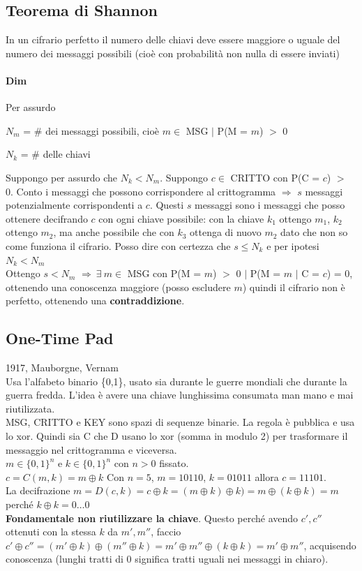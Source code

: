 \documentclass[10pt]{book}
\begin{document}
\subsection{Teorema di Shannon} In un cifrario perfetto il numero delle chiavi deve essere maggiore o uguale del numero dei messaggi possibili (cioè con probabilità non nulla di essere inviati)
\paragraph{Dim} Per assurdo
\begin{list}{}{}
	\item $N_m$ = \# dei messaggi possibili, cioè $m\in$ MSG $|$ P(M = $m$) $>$ 0
	\item $N_k$ = \# delle chiavi
\end{list}
\pagebreak
Suppongo per assurdo che $N_k < N_m$. Suppongo $c\in$ CRITTO con P(C = $c$) $>$ 0. Conto i messaggi che possono corrispondere al crittogramma $\Rightarrow$ $s$ messaggi potenzialmente corrispondenti a $c$. Questi $s$ messaggi sono i messaggi che posso ottenere decifrando $c$ con ogni chiave possibile: con la chiave $k_1$ ottengo $m_1$, $k_2$ ottengo $m_2$, ma anche possibile che con $k_3$ ottenga di nuovo $m_2$ dato che non so come funziona il cifrario. Posso dire con certezza che $s \leq N_k$ e per ipotesi $N_k < N_m$\\
Ottengo $s < N_m$ $\Rightarrow\:\exists\:m\in$ MSG con P(M = $m$) $>$ 0 $|$ P(M = $m$ $|$ C = $c$) = 0, ottenendo una conoscenza maggiore (posso escludere $m$) quindi il cifrario non è perfetto, ottenendo una \textbf{contraddizione}.
\subsection{One-Time Pad}
1917, Mauborgne, Vernam\\
Usa l'alfabeto binario \{0,1\}, usato sia durante le guerre mondiali che durante la guerra fredda. L'idea è avere una chiave lunghissima consumata man mano e mai riutilizzata.\\
MSG, CRITTO e KEY sono spazi di sequenze binarie. La regola è pubblica e usa lo xor. Quindi sia C che D usano lo xor (somma in modulo 2) per trasformare il messaggio nel crittogramma e viceversa.\\
$m\in\{0,1\}^n$ e $k\in\{0,1\}^n$ con $n > 0$ fissato.\\
$c = C(m, k) = m \oplus k$
Con $n=5$, $m=10110$, $k=01011$ allora $c=11101$.\\La decifrazione $m = D(c,k) = c \oplus k = (m\oplus k)\oplus k) = m \oplus (k \oplus k) = m$ perché $k \oplus k = 0\ldots 0$\\
\textbf{Fondamentale non riutilizzare la chiave}. Questo perché avendo $c', c''$ ottenuti con la stessa $k$ da $m',m''$, faccio $c'\oplus c'' = (m'\oplus k) \oplus (m''\oplus k) = m'\oplus m'' \oplus (k \oplus k) = m' \oplus m''$, acquisendo conoscenza (lunghi tratti di 0 significa tratti uguali nei messaggi in chiaro).
\end{document}

